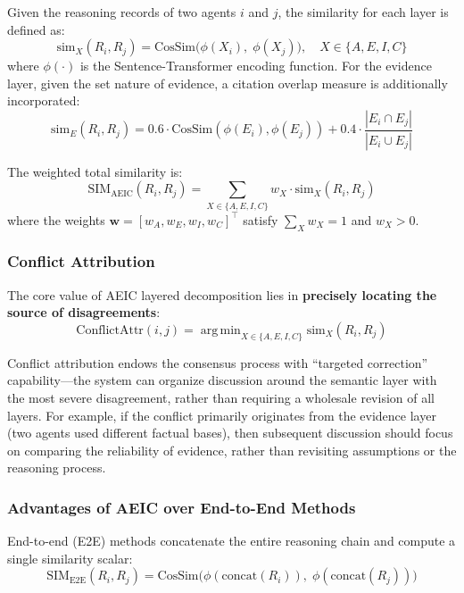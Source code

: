 \documentclass[12pt,a4paper]{article}
\DeclareMathOperator*{\argmin}{arg\,min}
\begin{document}
Given the reasoning records of two agents $i$ and $j$, the similarity for each layer is defined as:
\begin{equation}
\text{sim}_X(R_i, R_j) = \text{CosSim}\bigl(\phi(X_i),\; \phi(X_j)\bigr), \quad X \in \{A, E, I, C\}
\end{equation}
where $\phi(\cdot)$ is the Sentence-Transformer encoding function. For the evidence layer, given the set nature of evidence, a citation overlap measure is additionally incorporated:
\begin{equation}
\text{sim}_E(R_i, R_j) = 0.6 \cdot \text{CosSim}(\phi(E_i), \phi(E_j)) + 0.4 \cdot \frac{|E_i \cap E_j|}{|E_i \cup E_j|}
\end{equation}

The weighted total similarity is:
\begin{equation}\label{eq:sim_aeic}
\text{SIM}_{\text{AEIC}}(R_i, R_j) = \sum_{X \in \{A,E,I,C\}} w_X \cdot \text{sim}_X(R_i, R_j)
\end{equation}
where the weights $\mathbf{w} = [w_A, w_E, w_I, w_C]^\top$ satisfy $\sum_X w_X = 1$ and $w_X > 0$.

\subsubsection{Conflict Attribution}

The core value of AEIC layered decomposition lies in \textbf{precisely locating the source of disagreements}:
\begin{equation}
\text{ConflictAttr}(i, j) = \argmin_{X \in \{A,E,I,C\}} \text{sim}_X(R_i, R_j)
\end{equation}

Conflict attribution endows the consensus process with ``targeted correction'' capability---the system can organize discussion around the semantic layer with the most severe disagreement, rather than requiring a wholesale revision of all layers. For example, if the conflict primarily originates from the evidence layer (two agents used different factual bases), then subsequent discussion should focus on comparing the reliability of evidence, rather than revisiting assumptions or the reasoning process.

\subsubsection{Advantages of AEIC over End-to-End Methods}

End-to-end (E2E) methods concatenate the entire reasoning chain and compute a single similarity scalar:
\begin{equation}
\text{SIM}_{\text{E2E}}(R_i, R_j) = \text{CosSim}\bigl(\phi(\text{concat}(R_i)),\; \phi(\text{concat}(R_j))\bigr)
\end{equation}
\end{document}
